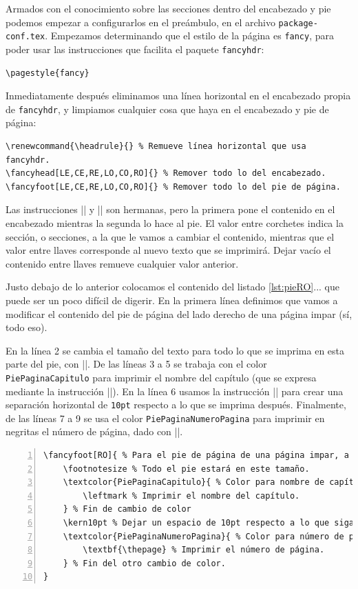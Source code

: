 Armados con el conocimiento sobre las secciones dentro del encabezado y pie podemos empezar a configurarlos en el preámbulo, en el archivo \texttt{package-conf.tex}. Empezamos determinando que el estilo de la página es \texttt{fancy}, para poder usar las instrucciones que facilita el paquete \texttt{fancyhdr}:

\begin{lstlisting}[style=latex]
\pagestyle{fancy}
\end{lstlisting}

Inmediatamente después eliminamos una línea horizontal en el encabezado propia de \texttt{fancyhdr}, y limpiamos cualquier cosa que haya en el encabezado y pie de página:

\begin{lstlisting}[style=latex]
\renewcommand{\headrule}{} % Remueve línea horizontal que usa fancyhdr.
\fancyhead[LE,CE,RE,LO,CO,RO]{} % Remover todo lo del encabezado.
\fancyfoot[LE,CE,RE,LO,CO,RO]{} % Remover todo lo del pie de página.
\end{lstlisting}

Las instrucciones |\fancyhead| y |\fancyfoot| son hermanas, pero la primera pone el contenido en el encabezado mientras la segunda lo hace al pie. El valor entre corchetes indica la sección, o secciones, a la que le vamos a cambiar el contenido, mientras que el valor entre llaves corresponde al nuevo texto que se imprimirá. Dejar vacío el contenido entre llaves remueve cualquier valor anterior.

Justo debajo de lo anterior colocamos el contenido del listado \ref{lst:pieRO}... que puede ser un poco difícil de digerir. En la primera línea definimos que vamos a modificar el contenido del pie de página del lado derecho de una página impar (sí, todo eso).

En la línea 2 se cambia el tamaño del texto para todo lo que se imprima en esta parte del pie, con |\footnotesize|. De las líneas 3 a 5 se trabaja con el color \texttt{PiePaginaCapitulo} para imprimir el nombre del capítulo (que se expresa mediante la instrucción |\leftmark|). En la línea 6 usamos la instrucción |\kern| para crear una separación horizontal de \texttt{10pt} respecto a lo que se imprima después. Finalmente, de las líneas 7 a 9 se usa el color \texttt{PiePaginaNumeroPagina} para imprimir en negritas el número de página, dado con |\thepage|.

\begin{lstlisting}[style=latex,numbers=left,label=lst:pieRO,caption={Pie de página a la derecha de una página impar.}]
\fancyfoot[RO]{ % Para el pie de página de una página impar, a la derecha.
    \footnotesize % Todo el pie estará en este tamaño.
    \textcolor{PiePaginaCapitulo}{ % Color para nombre de capítulo.
        \leftmark % Imprimir el nombre del capítulo.
    } % Fin de cambio de color
    \kern10pt % Dejar un espacio de 10pt respecto a lo que siga.
    \textcolor{PiePaginaNumeroPagina}{ % Color para número de página.
        \textbf{\thepage} % Imprimir el número de página.
    } % Fin del otro cambio de color.
}
\end{lstlisting}


